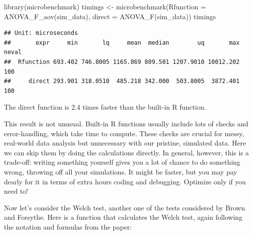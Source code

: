 \documentclass[
]{book}
\newenvironment{Shaded}{\begin{snugshade}}{\end{snugshade}}
\newcommand{\AttributeTok}[1]{\textcolor[rgb]{0.77,0.63,0.00}{#1}}
\newcommand{\FunctionTok}[1]{\textcolor[rgb]{0.00,0.00,0.00}{#1}}
\newcommand{\NormalTok}[1]{#1}
\newcommand{\OtherTok}[1]{\textcolor[rgb]{0.56,0.35,0.01}{#1}}
\begin{document}
\begin{Shaded}
\begin{Highlighting}[]
\FunctionTok{library}\NormalTok{(microbenchmark)}
\NormalTok{timings }\OtherTok{\textless{}{-}} \FunctionTok{microbenchmark}\NormalTok{(}\AttributeTok{Rfunction =} \FunctionTok{ANOVA\_F\_aov}\NormalTok{(sim\_data),}
                          \AttributeTok{direct    =} \FunctionTok{ANOVA\_F}\NormalTok{(sim\_data))}
\NormalTok{timings}
\end{Highlighting}
\end{Shaded}

\begin{verbatim}
## Unit: microseconds
##       expr     min       lq     mean  median        uq       max neval
##  Rfunction 693.402 746.8005 1165.869 809.501 1207.9010 10012.202   100
##     direct 293.901 318.0510  485.218 342.000  503.8005  3872.401   100
\end{verbatim}

The direct function is 2.4 times faster than the built-in R function.

This result is not unusual.
Built-in R functions usually include lots of checks and error-handling, which take time to compute. These checks are crucial for messy, real-world data analysis but unnecessary with our pristine, simulated data.
Here we can skip them by doing the calculations directly.
In general, however, this is a trade-off: writing something yourself gives you a lot of chance to do something wrong, throwing off all your simulations. It might be faster, but you may pay dearly for it in terms of extra hours coding and debugging.
Optimize only if you need to!

Now let's consider the Welch test, another one of the tests considered by Brown and Forsythe.
Here is a function that calculates the Welch test, again following the notation and formulas from the paper:
\end{document}
